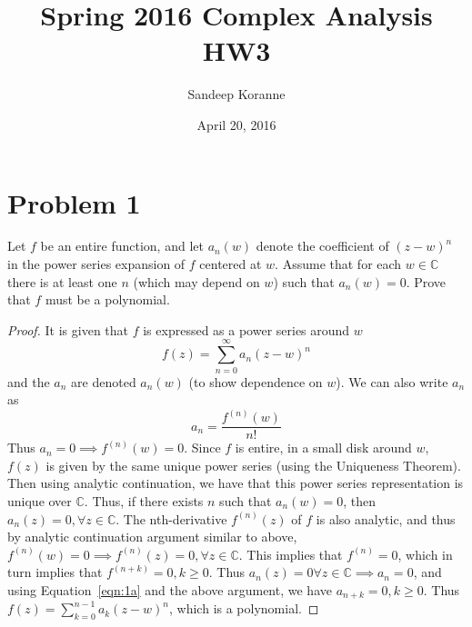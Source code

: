 \documentclass{article}[12pt]
\def\CC{{\mathbb C}}
\begin{document}
\title{Spring 2016 Complex Analysis HW3}
\author{Sandeep Koranne}
\date{April 20, 2016}
\maketitle


\section*{Problem 1}
Let $f$ be an entire function, and let $a_n(w)$ denote the
coefficient of $(z-w)^n$ in the power series expansion of $f$
centered at $w$. Assume that for each $w\in \CC$ there is at
least one $n$ (which may depend on $w$) such that $a_n(w)=0$. Prove
that $f$ must be a polynomial.
\begin{proof}
  It is given that $f$ is expressed as a power series around $w$
  \[
  f(z) = \sum_{n=0}^\infty a_n (z-w)^n
  \]
  and the $a_n$ are denoted $a_n(w)$ (to show dependence on $w$). We can
  also write $a_n$ as
  \begin{equation}
  a_n = \frac{f^{(n)}(w)}{n!}  \label{eqn:1a}
  \end{equation}
  Thus $a_n=0\implies f^{(n)}(w)=0$.
  Since $f$ is entire, in a small disk around $w$, $f(z)$ is given
  by the same unique power series (using the Uniqueness Theorem).
  Then using analytic continuation, we have that this power series
  representation is unique over $\CC$. Thus, if there exists $n$ such that
  $a_n(w)=0$, then $a_n(z)=0, \forall z\in \CC$. The nth-derivative $f^{(n)}(z)$ of
  $f$ is also analytic, and thus by analytic continuation argument
  similar to above, $f^{(n)}(w)=0\implies f^{(n)}(z)=0, \forall z\in \CC$.
  This implies that $f^{(n)}=0$, which in turn implies that $f^{(n+k)}=0, k\ge 0$.
  Thus $a_n(z)=0\forall z\in \CC\implies a_n=0$, and 
  using Equation~\ref{eqn:1a} and the above argument, we have
  $a_{n+k}=0, k\ge 0$. Thus $f(z)=\sum_{k=0}^{n-1} a_k(z-w)^n$, which is a polynomial.
\end{proof}
\end{document}
